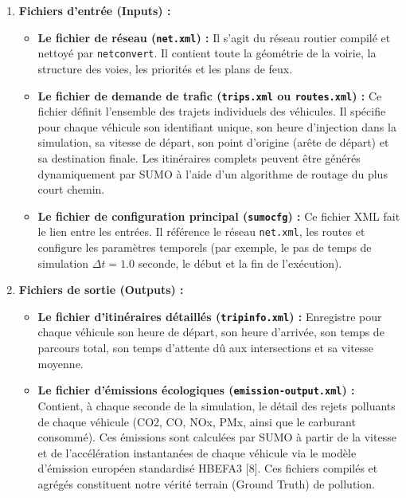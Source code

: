 \documentclass[10pt, a4paper]{article}
\providecommand{\tightlist}{}
\begin{document}
\begin{enumerate}
\def\labelenumi{\arabic{enumi}.}
\tightlist
\item
  \textbf{Fichiers d'entrée (Inputs) :}

  \begin{itemize}
  \tightlist
  \item
    \textbf{Le fichier de réseau (\texttt{net.xml}) :} Il s'agit du
    réseau routier compilé et nettoyé par \texttt{netconvert}. Il
    contient toute la géométrie de la voirie, la structure des voies,
    les priorités et les plans de feux.
  \item
    \textbf{Le fichier de demande de trafic (\texttt{trips.xml} ou
    \texttt{routes.xml}) :} Ce fichier définit l'ensemble des trajets
    individuels des véhicules. Il spécifie pour chaque véhicule son
    identifiant unique, son heure d'injection dans la simulation, sa
    vitesse de départ, son point d'origine (arête de départ) et sa
    destination finale. Les itinéraires complets peuvent être générés
    dynamiquement par SUMO à l'aide d'un algorithme de routage du plus
    court chemin.
  \item
    \textbf{Le fichier de configuration principal (\texttt{sumocfg}) :}
    Ce fichier XML fait le lien entre les entrées. Il référence le
    réseau \texttt{net.xml}, les routes et configure les paramètres
    temporels (par exemple, le pas de temps de simulation
    \(\Delta t = 1.0\) seconde, le début et la fin de l'exécution).
  \end{itemize}
\item
  \textbf{Fichiers de sortie (Outputs) :}

  \begin{itemize}
  \tightlist
  \item
    \textbf{Le fichier d'itinéraires détaillés (\texttt{tripinfo.xml})
    :} Enregistre pour chaque véhicule son heure de départ, son heure
    d'arrivée, son temps de parcours total, son temps d'attente dû aux
    intersections et sa vitesse moyenne.
  \item
    \textbf{Le fichier d'émissions écologiques
    (\texttt{emission-output.xml}) :} Contient, à chaque seconde de la
    simulation, le détail des rejets polluants de chaque véhicule (CO2,
    CO, NOx, PMx, ainsi que le carburant consommé). Ces émissions sont
    calculées par SUMO à partir de la vitesse et de l'accélération
    instantanées de chaque véhicule via le modèle d'émission européen
    standardisé HBEFA3 {[}8{]}. Ces fichiers compilés et agrégés
    constituent notre vérité terrain (Ground Truth) de pollution.
  \end{itemize}
\end{enumerate}
\end{document}
